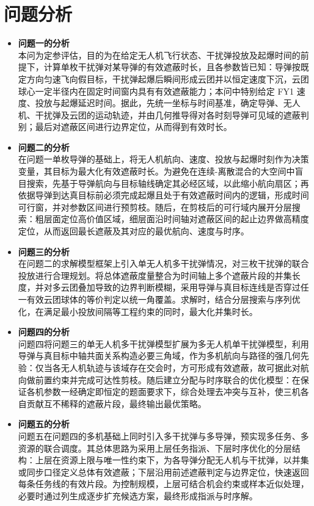 \documentclass[12pt,a4paper]{ctexart}
\numberwithin{equation}{section}
\begin{document}
\section{问题分析}
\begin{itemize}
	\item \textbf{问题一的分析} \\
    本问为定参评估，目的为在给定无人机飞行状态、干扰弹投放及起爆时间的前提下，计算单枚干扰弹对某导弹的有效遮蔽时长，且各参数皆已知：导弹按既定方向匀速飞向假目标，干扰弹起爆后瞬间形成云团并以恒定速度下沉，云团球心一定半径内在固定时间窗内具有有效遮蔽能力；本问中特别给定 FY1 速度、投放与起爆延迟时间。据此，先统一坐标与时间基准，确定导弹、无人机、干扰弹及云团的运动轨迹，并由几何推导得对各时刻导弹可见域的遮蔽判别；最后对遮蔽区间进行边界定位，从而得到有效时长。
    
	\item \textbf{问题二的分析} \\
    在问题一单枚导弹的基础上，将无人机航向、速度、投放与起爆时刻作为决策变量，其目标为最大化有效遮蔽时长。为避免在连续-离散混合的大空间中盲目搜索，先基于导弹航向与目标轴线确定其必经区域，以此缩小航向扇区；再依据导弹到达真目标前必须完成起爆且处于有效遮蔽时间内的逻辑，形成时间可行窗，并对参数区间进行预剪枝。随后，在剪枝后的可行域内展开分层搜索：粗层面定位高价值区域，细层面沿时间轴对遮蔽区间的起止边界做高精度定位，从而返回最长遮蔽及其对应的最优航向、速度与时序。

	\item \textbf{问题三的分析} \\
    在问题二的求解模型框架上引入单无人机多干扰弹情况，对三枚干扰弹的联合投放进行合理规划。将总体遮蔽度量整合为时间轴上多个遮蔽片段的并集长度，并对多云团叠加导致的边界判断模糊，采用导弹与真目标连线是否穿过任一有效云团球体的等价判定以统一角覆盖。求解时，结合分层搜索与序列优化，在满足最小投放间隔等工程约束的同时，最大化并集时长。
	
	\item \textbf{问题四的分析} \\
    问题四将问题三的单无人机多干扰弹模型扩展为多无人机单干扰弹模型，利用导弹与真目标中轴共面关系构造必要三角域，作为多机航向与路径的强几何先验：仅当各无人机轨迹与该域存在交会时，方可形成有效遮蔽，故可据此对航向做前置约束并完成可达性剪枝。随后建立分配与时序联合的优化模型：在保证各机参数一经确定即恒定的题面要求下，综合处理去冲突与互补，使三机各自贡献互不稀释的遮蔽片段，最终输出最优策略。
	
	 \item \textbf{问题五的分析} \\
    问题五在问题四的多机基础上同时引入多干扰弹与多导弹，预实现多任务、多资源的联合调度。其总体思路为采用上层任务指派、下层时序优化的分层结构：上层在资源上限与唯一性约束下，为各导弹分配无人机与干扰弹，以并集或同步口径定义总体有效遮蔽；下层沿用前述遮蔽判定与边界定位，快速返回每条任务线的有效片段。为控制规模，上层可结合机会约束或样本近似处理，必要时通过列生成逐步扩充候选方案，最终形成指派与时序解。
\end{itemize}
\end{document}
